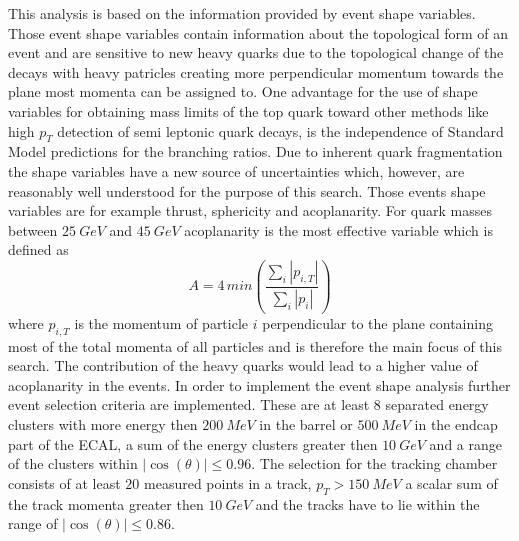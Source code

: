 \documentclass[11pt, twocolumn, a4paper]{article}
\begin{document}
This analysis is based on the information provided by event shape variables.
Those event shape variables contain information about the topological form of an event and are sensitive to new heavy quarks due to the topological change of the decays with heavy patricles creating more perpendicular momentum towards the plane most momenta can be assigned to.
One advantage for the use of shape variables for obtaining mass limits of the top quark toward other methods like high $p_T$ detection of semi leptonic quark decays, is the independence of Standard Model predictions for the branching ratios.
Due to inherent quark fragmentation the shape variables have a new source of uncertainties which, however, are reasonably well understood for the purpose of this search.
Those events shape variables are for example thrust, sphericity and acoplanarity.
For quark masses between $\SI{25}{GeV}$ and $\SI{45}{GeV}$ acoplanarity is the most effective variable which is defined as \cite{shape}
\begin{equation*}
	A = 4 \, min\left(\frac{\sum_i |p_{i,T}|}{\sum_i |p_i|}\right)
\end{equation*}
where $p_{i,T}$ is the momentum of particle $i$ perpendicular to the plane containing most of the total momenta of all particles and is therefore the main focus of this search.
The contribution of the heavy quarks would lead to a higher value of acoplanarity in the events.
In order to implement the event shape analysis further event selection criteria are implemented.
These are at least 8 separated energy clusters with more energy then $\SI{200}{MeV}$ in the barrel or $\SI{500}{MeV}$ in the endcap part of the ECAL, a sum of the energy clusters greater then $\SI{10}{GeV}$ and a range of the clusters within ${|\cos{(\theta)}|\le \num{0.96}}$. 
The selection for the tracking chamber consists of at least $20$ measured points in a track, $p_T > \SI{150}{MeV}$ a scalar sum of the track momenta greater then $\SI{10}{GeV}$ and the tracks have to lie within the range of ${|\cos{(\theta)}|\le \num{0.86}}$.\\
\end{document}
